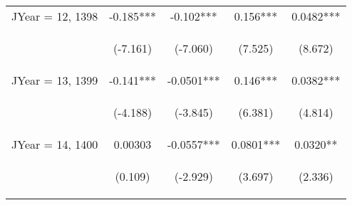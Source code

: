 \documentclass[]{standalone}
\begin{document}
\begin{tabular}{lcccc}
    JYear = 12, 1398 & -0.185***                                      & -0.102***                                      & 0.156***                                       & 0.0482***                                      \\
    \vspace{4pt}     & \begin{footnotesize}(-7.161)\end{footnotesize} & \begin{footnotesize}(-7.060)\end{footnotesize} & \begin{footnotesize}(7.525)\end{footnotesize}  & \begin{footnotesize}(8.672)\end{footnotesize}  \\
    JYear = 13, 1399 & -0.141***                                      & -0.0501***                                     & 0.146***                                       & 0.0382***                                      \\
    \vspace{4pt}     & \begin{footnotesize}(-4.188)\end{footnotesize} & \begin{footnotesize}(-3.845)\end{footnotesize} & \begin{footnotesize}(6.381)\end{footnotesize}  & \begin{footnotesize}(4.814)\end{footnotesize}  \\
    JYear = 14, 1400 & 0.00303                                        & -0.0557***                                     & 0.0801***                                      & 0.0320**                                       \\
    \vspace{4pt}     & \begin{footnotesize}(0.109)\end{footnotesize}  & \begin{footnotesize}(-2.929)\end{footnotesize} & \begin{footnotesize}(3.697)\end{footnotesize}  & \begin{footnotesize}(2.336)\end{footnotesize}  \\

\end{tabular}
\end{document}
